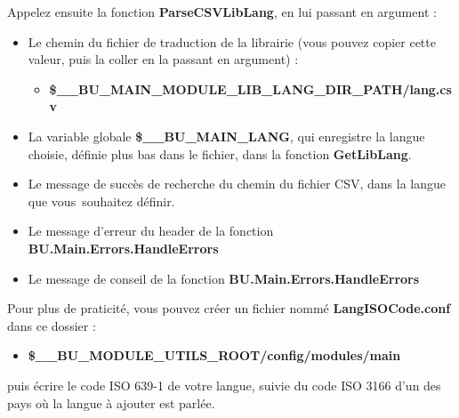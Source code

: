 \documentclass[a4paper,10pt]{article}
\begin{document}
    \begin{justify}
        Appelez ensuite la fonction \textbf{\color{mauve}ParseCSVLibLang}, en lui passant en argument :

        \begin{itemize}
            \item Le chemin du fichier de traduction de la librairie (vous pouvez copier cette valeur, puis la coller en la passant en argument) :
            \begin{itemize}
                \item \textbf{\color{vars}\$\_\_BU\_MAIN\_MODULE\_LIB\_LANG\_DIR\_PATH\color{path}/lang.csv}\\\mbox{}
            \end{itemize}

            \item La variable globale \textbf{\color{vars}\$\_\_BU\_MAIN\_LANG}, qui enregistre la langue choisie, définie plus bas dans le fichier, dans la fonction \textbf{\color{mauve}GetLibLang}.\\\mbox{}

            \item Le message de succès de recherche du chemin du fichier CSV, dans la langue que vous\ souhaitez définir.\\\mbox{}

            \item Le message d'erreur du header de la fonction \textbf{\color{mauve}BU.Main.Errors.HandleErrors}\\\mbox{}

            \item Le message de conseil de la fonction \textbf{\color{mauve}BU.Main.Errors.HandleErrors}
        \end{itemize}
    \end{justify}

    \begin{justify}
        Pour plus de praticité, vous pouvez créer un fichier nommé \textbf{\color{path}LangISOCode.conf} dans ce dossier :

        \begin{itemize}
            \item \textbf{\color{vars}\$\_\_BU\_MODULE\_UTILS\_ROOT\color{path}/config/modules/main}
        \end{itemize}
    \end{justify}

    \begin{justify}
        puis écrire le code ISO 639-1 de votre langue, suivie du code ISO 3166 d'un des pays où la langue à ajouter est parlée.
    \end{justify}
\end{document}
